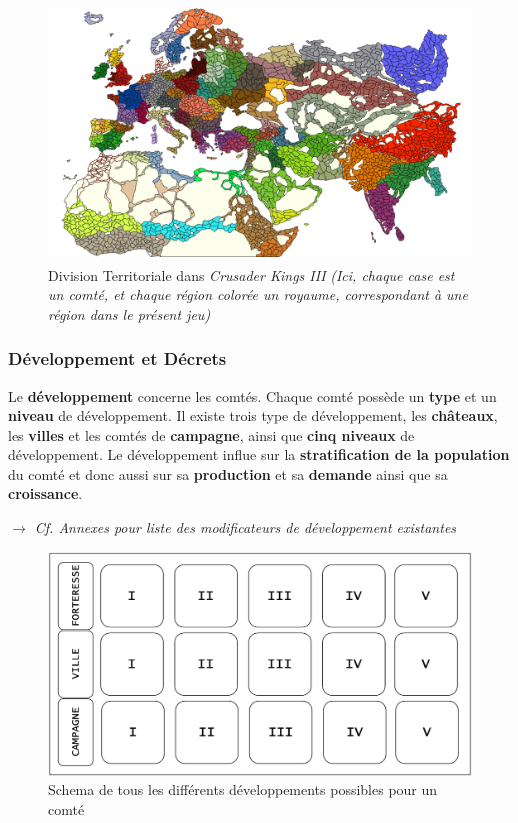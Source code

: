 \documentclass{article}
\def\reg{\small{\textsuperscript{\textregistered}}}
\begin{document}
                \begin{figure}[h]
                    \centering
                        \includegraphics[scale=0.3]{image_ck3_comtes.png}
                        \caption{Division Territoriale dans \textit{Crusader Kings III\reg} \textit{(Ici, chaque case est un comté, et chaque région colorée un royaume, correspondant à une région dans le présent jeu)}}
                        \label{fig:x photosysteme}
                \end{figure}

            \subsubsection{Développement et Décrets}
                Le \textbf{développement} concerne les comtés. Chaque comté possède un \textbf{type} et un \textbf{niveau} de développement. Il existe trois type de développement, les \textbf{châteaux}, les \textbf{villes} et les comtés de \textbf{campagne}, ainsi que \textbf{cinq niveaux} de développement. Le développement influe sur la \textbf{stratification de la population} du comté et donc aussi sur sa \textbf{production} et sa \textbf{demande} ainsi que sa \textbf{croissance}. 

                \textit{$\rightarrow$ Cf. Annexes pour liste des modificateurs de développement existantes}

                \begin{figure}[h]
                    \centering
                        \includegraphics[scale=0.3]{schema_developpement.png}
                        \caption{Schema de tous les différents développements possibles pour un comté}
                        \label{fig:x photosysteme}
                \end{figure}
\end{document}
